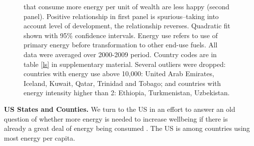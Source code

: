 \documentclass[10pt, letterpaper]{article}
\begin{document}
\begin{spacing}{1.0}
\begin{figure}[H]
{   that consume more energy per unit of wealth are less happy (second
   panel). Positive relationship in first panel is spurious--taking into
   account level of development, the relationship reverses. 
Quadratic fit shown with 95\%  confidence intervals. Energy use
   refers to use of primary energy before transformation to other end-use
   fuels. All data were averaged over 2000-2009 period.  %
 Country codes are in table \ref{ls} in supplementary material. 
 Several outliers were dropped: countries with energy use above 10,000: United Arab Emirates, Iceland, Kuwait, Qatar, Trinidad and Tobago; and countries with energy intensity higher than 2: Ethiopia, Turkmenistan, Uzbekistan.}\label{couWvsLsEnePerGdp2} 
\end{figure}

\textbf{US States and Counties.} We turn to the US in an effort to answer
an old question of whether more energy is needed to increase wellbeing if there
is already a great deal of energy being consumed \citep{mazur74}. The US is among
countries using most energy per capita.
%


\end{spacing}
\end{document}
